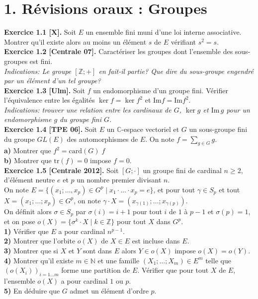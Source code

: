 \documentclass[a4paper,12pt,francais]{article}
\newcommand{\field}[1]{\mathbb{#1}}
\newcommand{\N}{\field{N}}
\newcommand{\Z}{\field{Z}}
\newcommand{\C}{\field{C}}
\newcommand{\im}{\mbox{Im}}
\newcommand{\card}{\mbox{card}}
\newcommand{\tr}{\mbox{tr}}
\begin{document}
\pagestyle{empty}
\noindent
\section*{1. Révisions oraux : Groupes}
\noindent
{\bf Exercice 1.1 [X].} Soit $E$ un ensemble fini muni d'une loi interne
associative. Montrer qu'il existe alors au moins un élément $s$ de $E$
vérifiant $s^2=s$.\\

\noindent
{\bf Exercice 1.2 [Centrale 07].} Caractériser les groupes dont l'ensemble des
sous-groupes est fini.\\
{\it Indications: Le groupe $[\Z;+]$ en fait-il partie? Que dire du
sous-groupe engendré par un élément d'un tel groupe? }\\

\noindent
{\bf Exercice 1.3 [Ulm].} Soit $f$ un endomorphisme d'un groupe
fini. Vérifier l'équivalence entre les égalités $\ker f= \ker f^2$ et $\im f= \im f^2$.\\ 
{\it Indications: trouver une relation entre les cardinaux de $G$,
  $\ker g$ et $\im \, g$ pour un endomorphisme $g$ du groupe fini $G$.}\\

\noindent
{\bf Exercice 1.4 [TPE 06].} Soit $E$ un $\C$-espace vectoriel et $G$
un sous-groupe fini du groupe $GL(E)$ des automorphismes de $E$. On note $\displaystyle f=\sum_{g \in G} g$.\\
\indent
{\bf a)} Montrer que $f^2=\card(G)\; f$\\
\indent
{\bf b)} Montrer que $\tr(f)=0$ impose $f=0$.\\

\noindent
{\bf Exercice 1.5 [Centrale 2012].} Soit $[G;\cdot]$ un groupe fini de cardinal $n\geqslant 2$, d'élément neutre $e$ et $p$ un nombre premier divisant $n$.\\
On note $E=\{(x_1;\dots,x_p)\in G^p \; |\; x_1 \cdot \dots \cdot x_p=e\}$, et pour tout $\gamma \in S_p$ et tout $X=(x_1;\dots;x_p)\in G^p$, on note $\gamma\cdot X= (x_{\gamma(1)};\dots;x_{\gamma(p)})$.\\
On définit alors $\sigma \in S_p$ par $\sigma(i)=i+1$ pour tout $i$ de $1$ à $p-1$ et $\sigma(p)=1$, et on pose $o(X)=\{\sigma^k\cdot X \; | \; k \in \Z \}$ pour tout $X$ dans $G^p$.\\
\indent
{\bf 1)} Vérifier que $E$ a pour cardinal $n^{p-1}$.\\
\indent
{\bf 2)} Montrer que l'orbite $o(X)$ de $X\in E$ est incluse dans $E$.\\
\indent
{\bf 3)} Montrer que si $X$ et $Y$ sont dans $E$ alors $Y \in  o(X)$ impose $o(X)=o(Y)$.\\
\indent
{\bf 4)} Montrer qu'il existe $m\in \N$ et une famille $(X_1;\dots;X_m)\in E^m$ telle que $\left({o(X_i)}\right)_{i=1\dots m}$ forme une partition de $E$. Vérifier que pour tout $X$ de $E$, l'ensemble $o(X)$ a pour cardinal $1$ ou $p$.\\
\indent 
{\bf 5)} En déduire que $G$ admet un élément d'ordre $p$.\\
\end{document}

